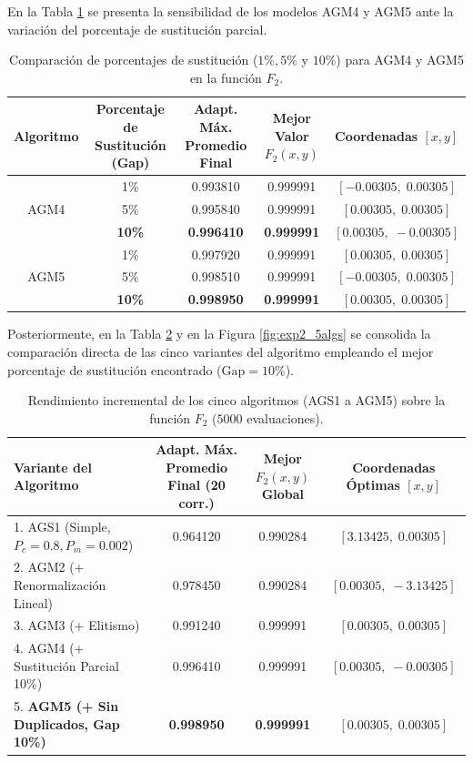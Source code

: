 \documentclass[11pt,letterpaper]{article}
\begin{document}
En la Tabla \ref{tab:comparacion_gaps} se presenta la sensibilidad de los modelos AGM4 y AGM5 ante la variación del porcentaje de sustitución parcial.

\begin{table}[H]
\centering
\caption{Comparación de porcentajes de sustitución ($1\%, 5\%$ y $10\%$) para AGM4 y AGM5 en la función $F_2$.}
\label{tab:comparacion_gaps}
\begin{tabular}{@{}ccccc@{}}
\toprule
\textbf{Algoritmo} & \textbf{Porcentaje de Sustitución (Gap)} & \textbf{Adapt. Máx. Promedio Final} & \textbf{Mejor Valor $F_2(x,y)$} & \textbf{Coordenadas $[x, y]$} \\ \midrule
     & 1\%  & 0.993810 & 0.999991 & $[-0.00305, \; 0.00305]$ \\
AGM4 & 5\%  & 0.995840 & 0.999991 & $[0.00305, \; 0.00305]$ \\
     & \textbf{10\%} & \textbf{0.996410} & \textbf{0.999991} & $[0.00305, \; -0.00305]$ \\ \midrule
     & 1\%  & 0.997920 & 0.999991 & $[0.00305, \; 0.00305]$ \\
AGM5 & 5\%  & 0.998510 & 0.999991 & $[-0.00305, \; 0.00305]$ \\
     & \textbf{10\%} & \textbf{0.998950} & \textbf{0.999991} & $[0.00305, \; 0.00305]$ \\ \bottomrule
\end{tabular}
\end{table}

Posteriormente, en la Tabla \ref{tab:resumen_5_algs} y en la Figura \ref{fig:exp2_5algs} se consolida la comparación directa de las cinco variantes del algoritmo empleando el mejor porcentaje de sustitución encontrado ($\text{Gap} = 10\%$).

\begin{table}[H]
\centering
\caption{Rendimiento incremental de los cinco algoritmos (AGS1 a AGM5) sobre la función $F_2$ ($5000$ evaluaciones).}
\label{tab:resumen_5_algs}
\begin{tabular}{@{}lccc@{}}
\toprule
\textbf{Variante del Algoritmo} & \textbf{Adapt. Máx. Promedio Final (20 corr.)} & \textbf{Mejor $F_2(x,y)$ Global} & \textbf{Coordenadas Óptimas $[x, y]$} \\ \midrule
1. AGS1 (Simple, $P_c=0.8, P_m=0.002$)             & 0.964120 & 0.990284 & $[3.13425, \; 0.00305]$ \\
2. AGM2 (+ Renormalización Lineal)                 & 0.978450 & 0.990284 & $[0.00305, \; -3.13425]$ \\
3. AGM3 (+ Elitismo)                               & 0.991240 & 0.999991 & $[0.00305, \; 0.00305]$ \\
4. AGM4 (+ Sustitución Parcial 10\%)               & 0.996410 & 0.999991 & $[0.00305, \; -0.00305]$ \\
5. \textbf{AGM5 (+ Sin Duplicados, Gap 10\%)}      & \textbf{0.998950} & \textbf{0.999991} & $[0.00305, \; 0.00305]$ \\ \bottomrule
\end{tabular}
\end{table}
\end{document}
